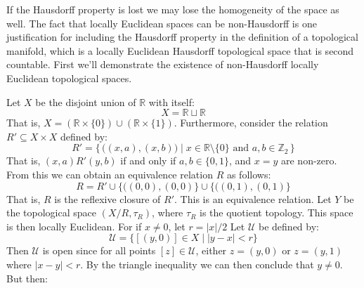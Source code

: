 \documentclass[oneside]{book}                                                  %
\begin{document}
            If the Hausdorff property is lost we may lose the homogeneity of the
            space as well. The fact that locally Euclidean spaces can be
            non-Hausdorff is one justification for including the Hausdorff
            property in the definition of a topological manifold, which is a
            locally Euclidean Hausdorff topological space that is second
            countable. First we'll demonstrate the existence of non-Hausdorff
            locally Euclidean topological spaces.
            \begin{example}
                Let $X$ be the disjoint union of $\mathbb{R}$ with itself:
                \begin{equation}
                    X=\mathbb{R}\sqcup\mathbb{R}
                \end{equation}
                That is, $X=(\mathbb{R}\times\{0\})\cup(\mathbb{R}\times\{1\})$.
                Furthermore, consider the relation $R'\subseteq{X}\times{X}$
                defined by:
                \begin{equation}
                    R'=\Big\{\,\Big((x,a),(x,b)\Big)\;\Big|\;
                        x\in\mathbb{R}\setminus\{0\}
                        \textrm{ and }a,b\in\mathbb{Z}_{2}\,\Big\}
                \end{equation}
                That is, $(x,a)R'(y,b)$ if and only if $a,b\in\{0,1\}$, and
                $x=y$ are non-zero. From this we can obtain an equivalence
                relation $R$ as follows:
                \begin{equation}
                    R=R'\cup\big\{\big((0,0),(0,0)\big\}\cup
                        \big\{\big((0,1),(0,1)\big\}
                \end{equation}
                That is, $R$ is the reflexive closure of $R'$. This is an
                equivalence relation. Let $Y$ be the topological space
                $(X/R,\tau_{R})$, where $\tau_{R}$ is the quotient topology.
                This space is then locally Euclidean. For if $x\ne{0}$, let
                $r=|x|/2$ Let $\mathcal{U}$ be defined by:
                \begin{equation}
                    \mathcal{U}=\big\{[(y,0)]\in{X}\;|\;|y-x|<r\big\}
                \end{equation}
                Then $\mathcal{U}$ is open since for all points
                $[z]\in\mathcal{U}$, either $z=(y,0)$ or $z=(y,1)$ where
                $|x-y|<r$. By the triangle inequality we can then conclude that
                $y\ne{0}$. But then:

\end{example}
\end{document}
